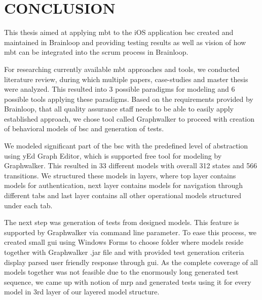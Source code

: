 \chapter{CONCLUSION}
\label{chapter:conclusion}

\par
This thesis aimed at applying \acrshort{mbt} to the iOS application \acrshort{bsc} created and maintained in Brainloop and providing testing results as well as vision of how \acrshort{mbt} can be integrated into the scrum process in Brainloop.

\par
For researching currently available \acrshort{mbt} approaches and tools, we conducted literature review, during which multiple papers, case-studies and master thesis were analyzed. This resulted into 3 possible paradigms for modeling and 6 possible tools applying these paradigms. Based on the requirements provided by Brainloop, that all quality assurance staff needs to be able to easily apply established approach, we chose tool called Graphwalker to proceed with creation of behavioral models of \acrshort{bsc} and generation of tests.

\par
We modeled significant part of the \acrshort{bsc} with the predefined level of abstraction using yEd Graph Editor, which is supported free tool for modeling by Graphwalker. This resulted in 33 different models with overall 312 states and 566 transitions. We structured these models in layers, where top layer contains models for authentication, next layer contains models for navigation through different tabs and last layer contains all other operational models structured under each tab.

\par
The next step was generation of tests from designed models. This feature is supported by Graphwalker via command line parameter. To ease this process, we created small \acrshort{gui} using Windows Forms to choose folder where models reside together with Graphwalker .jar file and with provided test generation criteria display parsed user friendly response through \acrshort{gui}. As the complete coverage of all models together was not feasible due to the enormously long generated test sequence, we came up with notion of \acrshort{mrp} and generated tests using it for every model in 3rd layer of our layered model structure.

